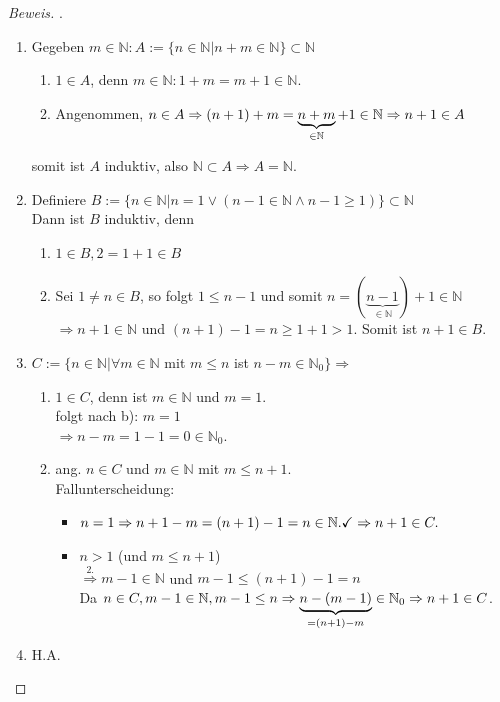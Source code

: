 \documentclass[12pt,a4paper,titlepage]{article} %
\theoremstyle{definition}
\theoremstyle{remark}
\newenvironment{bew}{\begin{proof}[Beweis]}{\end{proof}}
\begin{document}
\begin{bew}.%
\begin{enumerate}
	\item Gegeben $m\in\mathbb{N}: A :=\{n\in \mathbb{N}| n+m\in \mathbb{N}\}\subset \mathbb{N}$\\
	\begin{enumerate}
		\item $1\in A$, denn $m\in\mathbb{N}: 1+m = m+1\in\mathbb{N}$.
		\item Angenommen, $n\in A \Rightarrow (n+1) + m = \underbrace{n+m}_{\in\mathbb{N}} + 1 \in\mathbb{N}\\
		\Rightarrow n+1\in A$
	\end{enumerate} somit ist $A$ induktiv, also $\mathbb{N}\subset A \Rightarrow A = \mathbb{N}$.
	\item Definiere $B:= \{n\in \mathbb{N}|n=1 \vee (n-1\in\mathbb{N}\wedge n-1\geq 1)\} \subset \mathbb{N}$\\
	Dann ist $B$ induktiv, denn
	\begin{enumerate}
		\item $1\in B, 2=1+1\in B$
		\item Sei $1\neq n\in B$, so folgt $1\leq n-1$ und somit $n=(\underbrace{n-1}_{\in\mathbb{N}}) +1\in\mathbb{N}$\\
		$\Rightarrow n+1\in\mathbb{N}$ und $(n+1)-1=n\geq 1+1>1$.
		Somit ist $n+1\in B$.		
	\end{enumerate}
	\item $C:= \{n\in \mathbb{N} | \forall m \in \mathbb{N}$ mit $m\leq n$ ist $n-m\in \mathbb{N}_0\}\Rightarrow$
	\begin{enumerate}
		\item $1\in C$, denn ist $m\in \mathbb{N}$ und $m=1$.\\
		folgt nach b): $m=1$\\
		$\Rightarrow n - m = 1 - 1 = 0\in \mathbb{N}_0$.
		\item ang. $n\in C$ und $m\in\mathbb{N}$ mit $m\leq n+1$.\\
		Fallunterscheidung:
		\begin{itemize}
			\item $n=1 \Rightarrow n+1-m=(n+1)-1=n\in\mathbb{N}.\checkmark\\
			\Rightarrow n+1\in C.$
			\item $n > 1$ (und $m \leq n+1$)\\
			$\overset{\text{2.}}{\Rightarrow} m-1\in \mathbb{N}$ und $m-1 \leq (n+1)-1 = n$\\%
			Da $n\in C, m-1\in\mathbb{N}, m-1\leq n \Rightarrow \underbrace{n-(m-1)}_{=(n+1)-m} \in \mathbb{N}_0\\
			\Rightarrow n+1\in C$.
		\end{itemize}
	\end{enumerate}
	\item H.A.
\end{enumerate}
\end{bew}
\end{document}
